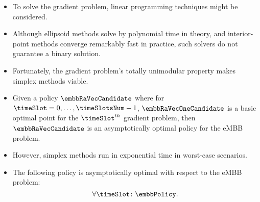 \begin{frame}
  \begin{itemize}
    \item To solve the gradient problem, linear programming techniques might be considered.
    \item Although ellipsoid methods solve by polynomial time in theory, and interior-point methods converge remarkably fast in practice, such solvers do not guarantee a binary solution.
    \item Fortunately, the gradient problem's totally unimodular property makes simplex methods viable.
  \end{itemize}
\end{frame}

\begin{frame}
  \begin{itemize}
    \item Given a policy $\embbRaVecCandidate$ where for $\timeSlot = 0, \dots, \timeSlotsNum - 1$, $\embbRaVecOneCandidate$ is a basic optimal point for the $\timeSlot^{th}$ gradient problem, then $\embbRaVecCandidate$ is an asymptotically optimal policy for the eMBB problem\proofFootnote.
  \end{itemize}
\end{frame}

\begin{frame}
  \begin{itemize}
    \item However, simplex methods run in exponential time in worst-case scenarios.
  \end{itemize}
\end{frame}

\begin{frame}
  \begin{itemize}
    \item The following policy is asymptotically optimal with respect to the eMBB problem\proofFootnote:
      \begin{equation}
        \forall\timeSlot \colon \embbPolicy.
      \end{equation}
  \end{itemize}
\end{frame}

